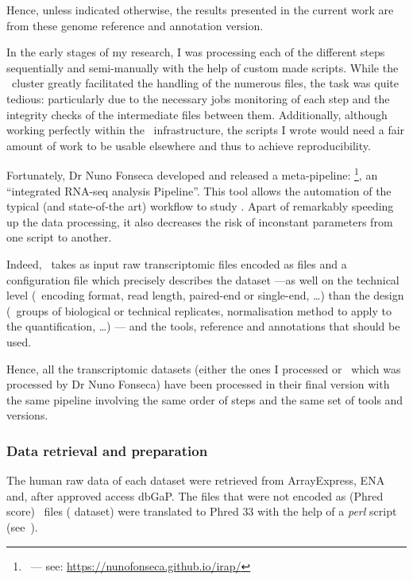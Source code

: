 Hence, unless indicated otherwise, the results presented in the current work are
from these genome reference and annotation version.

In the early stages of my research, I was processing each of the different steps
sequentially and semi-manually with the help of custom made scripts.
While the \EBI\ cluster greatly facilitated the handling of the numerous files,
the task was quite tedious: particularly due to the necessary jobs monitoring of
each step and the integrity checks of the intermediate files between them.
Additionally, although working perfectly within the \EBI\ infrastructure,
the scripts I wrote would need a fair amount of work to be usable elsewhere and
thus to achieve reproducibility.

Fortunately, Dr Nuno Fonseca developed and released a meta-pipeline:
\irap\footnote{\irap\ --- see: \href{https://nunofonseca.github.io/irap/}%
{https://nunofonseca.github.io/irap/}}, an ``integrated RNA-seq analysis
Pipeline''. This tool allows the automation of the typical
(and state-of-the art) workflow to study
\Rnaseq. Apart of remarkably speeding up the data processing, it also
decreases the risk of inconstant parameters from one script to another.

Indeed, \irap\ takes as input raw transcriptomic files encoded as \emph{\fastq}
files and a configuration file which precisely describes the dataset ---as well
on the technical level (\eg\ encoding format, read length, paired-end or
single-end, \ldots) than the design (\eg\ groups of biological or
technical replicates, normalisation method to apply to the
quantification, \ldots) ---
and the tools, reference and annotations that should be used.
\begin{comment}
While the
configuration is exhaustive and takes time to be written, it is then really easy
to try out different set of parameters.
\end{comment}

Hence, all the transcriptomic datasets (either the ones I processed or \Gtex\
which was processed by Dr Nuno Fonseca) have been processed in their final
version with the same pipeline involving the same order of steps and the same
set of tools and versions.


\subsubsection{Data retrieval and preparation}

The human raw data of each dataset were retrieved from \gls{ArrayExpress},
\gls{ENA} and, after approved access \gls{dbGaP}.
The files that were not encoded as (Phred score) \fastq\ files
( dataset) were translated to \gls{Phred} $33$ with the help of
a \emph{perl} script (see~\Cref{code:fastq}).

